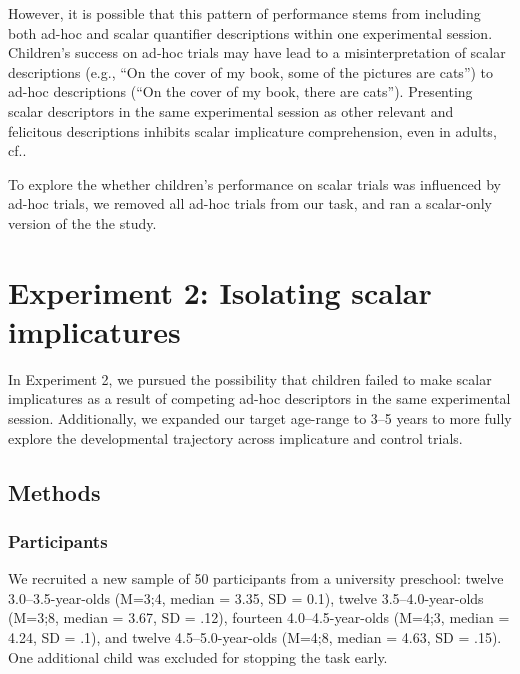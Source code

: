 \documentclass[man]{apa2}
\begin{document}
However, it is possible that this pattern of performance stems from including both ad-hoc and scalar quantifier descriptions within one experimental session. Children's success on ad-hoc trials may have lead to a misinterpretation of  scalar descriptions (e.g., ``On the cover of my book, some of the pictures are cats'') to ad-hoc descriptions (``On the cover of my book, there are cats''). Presenting scalar descriptors in the same experimental session as other relevant and felicitous descriptions inhibits scalar implicature comprehension, even in adults, cf.\cite{degenalt2015}. 

To explore the whether children's performance on scalar trials was influenced by ad-hoc trials, we removed all ad-hoc trials from our task, and ran a scalar-only version of the the study.

\section{Experiment 2: Isolating scalar implicatures}
In Experiment 2, we pursued the possibility that children failed to make scalar implicatures as a result of competing ad-hoc descriptors in the same experimental session. Additionally, we expanded our target age-range to 3--5 years to more fully explore the developmental trajectory across implicature and control trials.

\subsection{Methods}
\subsubsection{Participants} 

We recruited a new sample of 50 participants from a university preschool: twelve 3.0--3.5-year-olds (M=3;4, median = 3.35, SD = 0.1), twelve 3.5--4.0-year-olds (M=3;8, median = 3.67, SD = .12), fourteen 4.0--4.5-year-olds (M=4;3, median = 4.24, SD = .1), and twelve 4.5--5.0-year-olds (M=4;8, median = 4.63, SD = .15). One additional child was excluded for stopping the task early.
\end{document}
